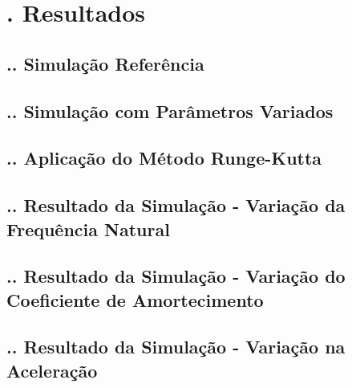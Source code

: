 \documentclass[aspectratio=169]{beamer}
\begin{document}
\section{\insertsectionnumber . Resultados}

\subsection{\insertsectionnumber .\insertsubsectionnumber . Simulação Referência}
\begin{frame}
  \frametitle{\insertsubsection}
\end{frame}

\subsection{\insertsectionnumber .\insertsubsectionnumber . Simulação com Parâmetros Variados}
\begin{frame}
  \frametitle{\insertsubsection}
\end{frame}

\subsection{\insertsectionnumber .\insertsubsectionnumber . Aplicação do Método Runge-Kutta}
\begin{frame}
  \frametitle{\insertsubsection}
\end{frame}

\subsection{\insertsectionnumber .\insertsubsectionnumber . Resultado da Simulação - Variação da Frequência Natural}
\begin{frame}
  \frametitle{\insertsubsection}
\end{frame}

\subsection{\insertsectionnumber .\insertsubsectionnumber . Resultado da Simulação - Variação do Coeficiente de Amortecimento}
\begin{frame}
  \frametitle{\insertsubsection}
\end{frame}

\subsection{\insertsectionnumber .\insertsubsectionnumber . Resultado da Simulação - Variação na Aceleração}
\begin{frame}
  \frametitle{\insertsubsection}
\end{frame}
\end{document}
